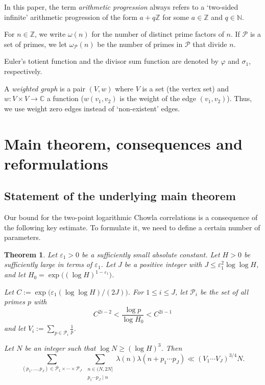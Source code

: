 \documentclass[11pt]{amsart}
\newtheorem{theorem}{Theorem}[section]
\theoremstyle{definition}
\renewcommand{\leq}{\leqslant}
\renewcommand{\geq}{\geqslant}
\newcommand{\eps}{\varepsilon}
\newcommand{\Z}{\mathbb{Z}}
\newcommand{\C}{\mathbb{C}}
\newcommand{\primes}{\mathcal{P}}
\newcommand{\cstH}{\eps_1}
\newcommand{\curlyL}{V}
\newcommand{\modulus}{q}
\newcommand{\repR}{J}
\begin{document}
In this paper, the term \emph{arithmetic progression} always refers to a `two-sided infinite' arithmetic progression of the form $a+q\Z$ for some $a\in \Z$ and $q\in \mathbb{N}$. %

For $n\in \Z$, we write $\omega(n)$ for the number of distinct prime factors of $n$. If $\primes$ is a set of primes, we let $\omega_{\primes}(n)$ be the number of primes in $\primes$ that divide $n$.


Euler's totient function and the divisor sum function are denoted by $\varphi$ and $\sigma_1$, respectively.

A \emph{weighted graph} is a pair $(V, w)$ where $V$ is a set (the vertex set) and $w : V\times V \to \C$ a function ($w(v_1, v_2)$ is the weight of the edge $(v_1, v_2)$). Thus, we use weight zero edges instead of `non-existent' edges.


\section{Main theorem, consequences and reformulations}
\label{sec:thesecondsection}
\subsection{Statement of the underlying main theorem}
Our bound for the two-point logarithmic Chowla correlations is a consequence of the following key estimate. To formulate it, we need to define a certain number of parameters. 

\begin{theorem}
\label{thm:main}
Let $\cstH>0$ be a sufficiently small absolute constant. Let $H>0$ be sufficiently large in terms of $\cstH$. Let $\repR$ be a positive integer with $\repR \leq \cstH^2 \log \log H$, and let $H_0 = \exp \big((\log H)^{1-\cstH}\big)$.

Let $C := \exp\big(\cstH (\log \log H)/(2\repR)\big)$. For $1\leq i\leq \repR$, let $\primes_i$ be the set of all primes $p$ with
\begin{equation*}
C^{2i-2} < \frac{\log p}{\log H_0} < C^{2i-1}
\end{equation*}
and let $\curlyL_i := \sum_{p\in \primes_i} \frac{1}{p}$.

Let $N$ be an integer such that $\log N \geq (\log H)^3$. Then
\begin{equation}
\label{eq:summainthm}
	\sum_{(p_1, \ldots, p_{\repR})\in \primes_1\times \cdots \times \primes_{\repR}}\,  \sum_{\substack{n\in (N, 2N] \\ p_1\cdots p_{\repR} \mid n}}\lambda(n) \lambda(n+p_1\cdots p_{\repR}) \ll (\curlyL_1\cdots \curlyL_{\repR})^{3/4} N.
\end{equation}
\end{theorem}
\end{document}
